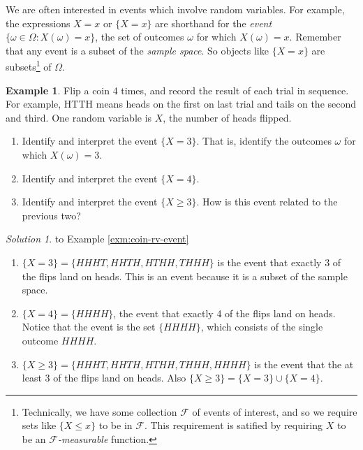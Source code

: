 \documentclass[
]{book}
\providecommand{\tightlist}{%
  \setlength{\itemsep}{0pt}\setlength{\parskip}{0pt}}
\theoremstyle{definition}
\theoremstyle{definition}
\newtheorem{example}{Example}[chapter]
\theoremstyle{definition}
\theoremstyle{remark}
\newtheorem*{solution}{Solution}
\begin{document}
We are often interested in events which involve random variables. For example, the expressions \(X=x\) or \(\{X=x\}\) are shorthand for the \emph{event} \(\{\omega\in\Omega: X(\omega)=x\}\), the set of outcomes \(\omega\) for which \(X(\omega)=x\). Remember that any event is a subset of the \emph{sample space}. So objects like \(\{X=x\}\) are subsets\footnote{Technically, we have some collection \(\mathcal{F}\) of events of interest, and so we require sets like \(\{X\le x\}\) to be in \(\mathcal{F}\). This requirement is satified by requiring \(X\) to be an \emph{\(\mathcal{F}\)-measurable} function.} of \(\Omega\).

\begin{example}
\protect\hypertarget{exm:coin-rv-event}{}{\label{exm:coin-rv-event} }Flip a coin 4 times, and record the result of each trial in sequence. For example, HTTH means heads on the first on last trial and tails on the second and third. One random variable is \(X\), the number of heads flipped.
\end{example}

\begin{enumerate}
\def\labelenumi{\arabic{enumi}.}
\tightlist
\item
  Identify and interpret the event \(\{X=3\}\). That is, identify the outcomes \(\omega\) for which \(X(\omega)=3\).
\item
  Identify and interpret the event \(\{X=4\}\).
\item
  Identify and interpret the event \(\{X\ge3\}\). How is this event related to the previous two?
\end{enumerate}

\begin{solution}
{}to Example \ref{exm:coin-rv-event}
\end{solution}

\begin{enumerate}
\def\labelenumi{\arabic{enumi}.}
\tightlist
\item
  \(\{X=3\} = \{HHHT, HHTH, HTHH, THHH\}\) is the event that exactly 3 of the flips land on heads. This is an event because it is a subset of the sample space.
\item
  \(\{X=4\}= \{HHHH\}\), the event that exactly 4 of the flips land on heads. Notice that the event is the set \(\{HHHH\}\), which consists of the single outcome \(HHHH\).
\item
  \(\{X\ge3\} = \{HHHT, HHTH, HTHH, THHH, HHHH\}\) is the event that the at least 3 of the flips land on heads. Also \(\{X\ge 3\} = \{X=3\}\cup \{X=4\}\).
\end{enumerate}
\end{document}
